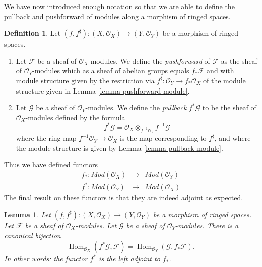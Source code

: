 \documentclass{stacks-project}
\theoremstyle{plain}
\newtheorem{lemma}[subsection]{Lemma}
\theoremstyle{definition}
\newtheorem{definition}[subsection]{Definition}
\theoremstyle{remark}
\numberwithin{equation}{subsection}
\def\Hom{\mathop{\mathrm{Hom}}\nolimits}
\begin{document}
\noindent
We have now introduced enough notation so that we are able to
define the pullback and pushforward of modules along a morphism
of ringed spaces.

\begin{definition}
\label{definition-pushforward}
Let $(f, f^\sharp) : (X, \mathcal{O}_X) \to (Y, \mathcal{O}_Y)$
be a morphism of ringed spaces.
\begin{enumerate}
\item Let $\mathcal{F}$ be a sheaf of $\mathcal{O}_X$-modules.
We define the {\it pushforward} of $\mathcal{F}$ as the
sheaf of $\mathcal{O}_Y$-modules which as a sheaf
of abelian groups equals $f_*\mathcal{F}$ and with
module structure given by the restriction
via $f^\sharp : \mathcal{O}_Y \to f_*\mathcal{O}_X$
of the module structure given
in Lemma \ref{lemma-pushforward-module}.
\item Let $\mathcal{G}$ be a sheaf of $\mathcal{O}_Y$-modules.
We define the {\it pullback} $f^*\mathcal{G}$ to be the
sheaf of $\mathcal{O}_X$-modules defined by the formula
$$
f^*\mathcal{G}
=
\mathcal{O}_X \otimes_{f^{-1}\mathcal{O}_Y} f^{-1}\mathcal{G}
$$
where the ring map $f^{-1}\mathcal{O}_Y \to \mathcal{O}_X$
is the map corresponding to $f^\sharp$, and where the  module
structure is given by Lemma \ref{lemma-pullback-module}.
\end{enumerate}
\end{definition}

\noindent
Thus we have defined functors
\begin{eqnarray*}
f_* : \textit{Mod}(\mathcal{O}_X)
& \longrightarrow &
\textit{Mod}(\mathcal{O}_Y) \\
f^* : \textit{Mod}(\mathcal{O}_Y)
& \longrightarrow &
\textit{Mod}(\mathcal{O}_X)
\end{eqnarray*}
The final result on these functors is that they are indeed
adjoint as expected.

\begin{lemma}
\label{lemma-adjoint-pullback-pushforward-modules}
Let $(f, f^\sharp) : (X, \mathcal{O}_X) \to (Y, \mathcal{O}_Y)$
be a morphism of ringed spaces.
Let $\mathcal{F}$ be a sheaf of $\mathcal{O}_X$-modules.
Let $\mathcal{G}$ be a sheaf of $\mathcal{O}_Y$-modules.
There is a canonical bijection
$$
\Hom_{\mathcal{O}_X}(f^*\mathcal{G}, \mathcal{F})
=
\Hom_{\mathcal{O}_Y}(\mathcal{G}, f_*\mathcal{F}).
$$
In other words: the functor $f^*$ is the left adjoint to
$f_*$.
\end{lemma}
\end{document}
